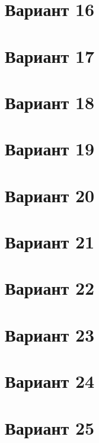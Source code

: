 \documentclass[12pt]{article}
\begin{document}
\section{Вариант 16}

\section{Вариант 17}

\section{Вариант 18}

\section{Вариант 19}

\section{Вариант 20}

\section{Вариант 21}

\section{Вариант 22}

\section{Вариант 23}

\section{Вариант 24}

\section{Вариант 25}
\end{document}
